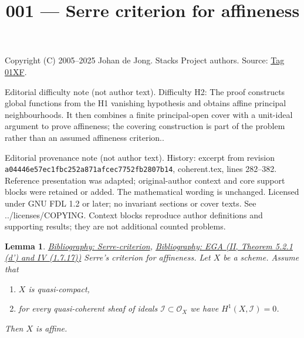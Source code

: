 \documentclass{amsart}
\newenvironment{reference}{\comment}{\endcomment}
\newenvironment{slogan}{\comment}{\endcomment}
\theoremstyle{plain}
\newtheorem{lemma}[subsection]{Lemma}
\theoremstyle{definition}
\theoremstyle{remark}
\numberwithin{equation}{subsection}
\begin{document}
\title[Stacks Project, Tag 01XF]{001 --- Serre criterion for affineness}
\maketitle
\noindent Copyright (C) 2005--2025 Johan de Jong. Stacks Project authors. Source: \href{https://stacks.math.columbia.edu/tag/01XF}{Tag 01XF}.

\noindent Editorial difficulty note (not author text). Difficulty H2: The proof constructs global functions from the H1 vanishing hypothesis and obtains affine principal neighbourhoods. It then combines a finite principal-open cover with a unit-ideal argument to prove affineness; the covering construction is part of the problem rather than an assumed affineness criterion..

\noindent Editorial provenance note (not author text). History: excerpt from revision \texttt{a0444\allowbreak 6e57e\allowbreak c1fbc\allowbreak 252a8\allowbreak 71afc\allowbreak ec775\allowbreak 2fb28\allowbreak 07b14}, coherent.tex, lines 282--382. Reference presentation was adapted; original-author context and core support blocks were retained or added. The mathematical wording is unchanged. Licensed under GNU FDL 1.2 or later; no invariant sections or cover texts. See ../licenses/COPYING. Context blocks reproduce author definitions and supporting results; they are not additional counted problems.

\begin{lemma}
\label{lemma-quasi-compact-h1-zero-covering}
\begin{reference}
\href{https://stacks.math.columbia.edu/bibliography}{Bibliography: Serre-criterion}, \href{https://stacks.math.columbia.edu/bibliography}{Bibliography: EGA (II, Theorem 5.2.1 (d') and IV (1.7.17))}
\end{reference}
\begin{slogan}
Serre's criterion for affineness.
\end{slogan}
Let $X$ be a scheme.
Assume that
\begin{enumerate}
\item $X$ is quasi-compact,
\item for every quasi-coherent sheaf of ideals
$\mathcal{I} \subset \mathcal{O}_X$ we have $H^1(X, \mathcal{I}) = 0$.
\end{enumerate}
Then $X$ is affine.
\end{lemma}
\end{document}

